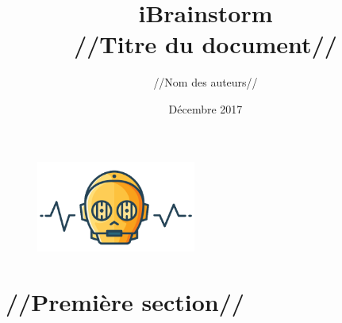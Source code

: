 \documentclass[french]{article}
\title{iBrainstorm
\\//Titre du document//}
\author{//Nom des auteurs//}
\date{Décembre 2017}
\begin{document}
\maketitle

\medskip

\begin{figure}[h]
\includegraphics[height=3cm]{c3po.png}
\centering
\end{figure}

\section{//Première section//}
\end{document}
